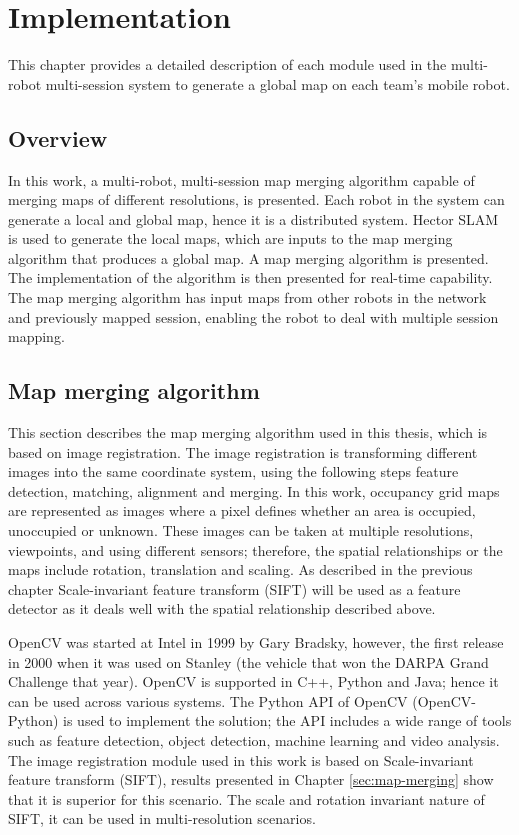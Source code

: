 \chapter{Implementation}
\label{ch:implementation}
This chapter provides a detailed description of each module used in the multi-robot multi-session system to generate a global map on each team's mobile robot. 

\section{Overview}

In this work, a multi-robot, multi-session map merging algorithm capable of merging maps of different resolutions, is presented. Each robot in the system can generate a local and global map, hence it is a distributed system. Hector SLAM is used to generate the local maps, which are inputs to the map merging algorithm that produces a global map. A map merging algorithm is presented. The implementation of the algorithm is then presented for real-time capability. The map merging algorithm has input maps from other robots in the network and previously mapped session, enabling the robot to deal with multiple session mapping. 

\section{Map merging algorithm}
\label{sec:map_merging_algorithm}

This section describes the map merging algorithm used in this thesis, which is based on image registration. The image registration is transforming different images into the same coordinate system, using the following steps feature detection, matching, alignment and merging. In this work, occupancy grid maps are represented as images where a pixel defines whether an area is occupied, unoccupied or unknown. These images can be taken at multiple resolutions, viewpoints, and using different sensors; therefore, the spatial relationships or the maps include rotation, translation and scaling. As described in the previous chapter Scale-invariant feature transform (SIFT) will be used as a feature detector as it deals well with the spatial relationship described above. 

OpenCV was started at Intel in 1999 by Gary Bradsky, however, the first release in 2000 when it was used on Stanley (the vehicle that won the DARPA Grand Challenge that year). OpenCV is supported in C++, Python and Java; hence it can be used across various systems. The Python API of OpenCV (OpenCV-Python) is used to implement the solution; the API includes a wide range of tools such as feature detection, object detection, machine learning and video analysis. The image registration module used in this work is based on Scale-invariant feature transform (SIFT), results presented in Chapter \ref{sec:map-merging} show that it is superior for this scenario. The scale and rotation invariant nature of SIFT, it can be used in multi-resolution scenarios.

